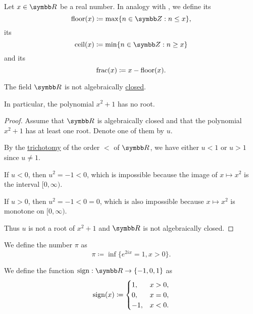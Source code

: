 \begin{definition}\label{def:floor_ceiling_functions}
  Let \( x \in \BR \) be a real number. In analogy with , we define its 
  \begin{equation*}
    \Floor(x) \coloneqq \max \{ n \in \BZ : n \leq x \},
  \end{equation*}
  its 
  \begin{equation*}
    \Ceil(x) \coloneqq \min \{ n \in \BZ : n \geq x \}
  \end{equation*}
  and its 
  \begin{equation*}
    \operatorname{frac}(x) \coloneqq x - \operatorname{floor}(x).
  \end{equation*}
\end{definition}

\begin{proposition}\label{thm:reals_not_algebraically_closed}
  The field \( \BR \) is not algebraically \hyperref[def:algebraically_closed_field]{closed}.

  In particular, the polynomial \( x^2 + 1 \) has no root.
\end{proposition}
\begin{proof}
  Assume that \( \BR \) is algebraically closed and that the polynomial \( x^2 + 1 \) has at least one root. Denote one of them by \( u \).

  By the \hyperref[def:binary_relation/trichotomic]{trichotomy} of the order \( < \) of \( \BR \), we have either \( u < 1 \) or \( u > 1 \) since \( u \neq 1 \).

  If \( u < 0 \), then \( u^2 = -1 < 0 \), which is impossible because the image of \( x \mapsto x^2 \) is the interval \( [0, \infty) \).

  If \( u > 0 \), then \( u^2 = -1 < 0 = 0 \), which is also impossible because \( x \mapsto x^2 \) is monotone on \( [0, \infty) \).

  Thus \( u \) is not a root of \( x^2 + 1 \) and \( \BR \) is not algebraically closed.
\end{proof}

\begin{definition}\label{def:pi}\cite[515]{Knapp2016BAlg}
  We define the number \( \pi \) as
  \begin{equation*}
    \pi \coloneqq \inf\{ e^{2ix} = 1, x > 0 \}.
  \end{equation*}
\end{definition}

\begin{definition}\label{def:signum}
  We define the  function \( \Sign: \BR \to \{ -1, 0, 1 \} \) as
  \begin{equation*}
    \operatorname{sign}(x) \coloneqq \begin{cases}
      1,  &x > 0, \\
      0,  &x = 0, \\
      -1, &x < 0.
    \end{cases}
  \end{equation*}
\end{definition}
